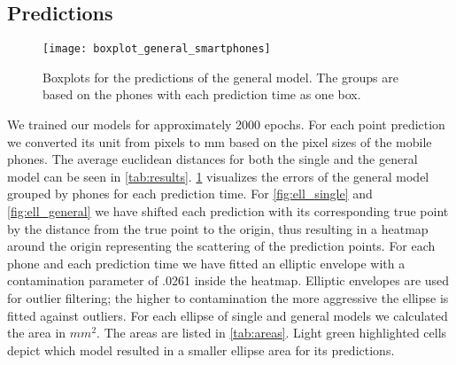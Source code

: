 \subsection{Predictions}
\begin{figure}[t]
	\texttt{[image: boxplot\_general\_smartphones]}
	\caption{Boxplots for the predictions of the general model. The groups are based on the phones with each prediction time as one box.}
	\label{fig:boxplots_general}
\end{figure}
We trained our models for approximately 2000 epochs.
For each point prediction we converted its unit from pixels to mm based on the pixel sizes of the mobile phones.
The average euclidean distances for both the single and the general model can be seen in \cref{tab:results}.
\cref{fig:boxplots_general} visualizes the errors of the general model grouped by phones for each prediction time.
For \cref{fig:ell_single} and \cref{fig:ell_general} we have shifted each prediction with its corresponding true point by the distance from the true point to the origin, thus resulting in a heatmap around the origin representing the scattering of the prediction points.
For each phone and each prediction time we have fitted an elliptic envelope with a contamination parameter of .0261 inside the heatmap.
Elliptic envelopes are used for outlier filtering; the higher to contamination the more aggressive the ellipse is fitted against outliers.
For each ellipse of single and general models we calculated the area in $ mm^{2}$.
The areas are listed in \cref{tab:areas}.
Light green highlighted cells depict which model resulted in a smaller ellipse area for its predictions.
